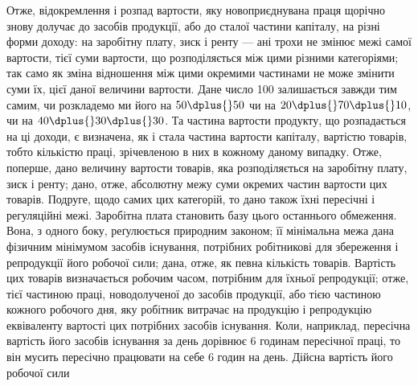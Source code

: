 Отже, відокремлення і розпад вартости, яку новоприєднувана праця щорічно
знову долучає до засобів продукції, або до сталої частини капіталу, на різні форми
доходу: на заробітну плату, зиск і ренту — ані трохи не змінює межі самої вартости,
тієї суми вартости, що розподіляється між цими різними категоріями; так
само як зміна відношення між цими окремими частинами не може змінити суми їх,
цієї даної величини вартости. Дане число 100 залишається завжди тим самим, чи
розкладемо ми його на $50 \dplus{} 50$ чи на $20 \dplus{} 70 \dplus{} 10$, чи на $40 \dplus{} 30 \dplus{} 30$. Та
частина вартости продукту, що розпадається на ці доходи, є визначена, як і стала
частина вартости капіталу, вартістю товарів, тобто кількістю праці, зрічевленою
в них в кожному даному випадку. Отже, поперше, дано величину вартости
товарів, яка розподіляється на заробітну плату, зиск і ренту; дано, отже, абсолютну
межу суми окремих частин вартости цих товарів. Подруге, щодо самих
цих категорій, то дано також їхні пересічні і регуляційні межі. Заробітна плата
становить базу цього останнього обмеження. Вона, з одного боку, реґулюється
природним законом; її мінімальна межа дана фізичним мінімумом засобів існування,
потрібних робітникові для збереження і репродукції його робочої сили;
дана, отже, як певна кількість товарів. Вартість цих товарів визначається робочим
часом, потрібним для їхньої репродукції; отже, тієї частиною праці, новодолученої
до засобів продукції, або тією частиною кожного робочого дня, яку
робітник витрачає на продукцію і репродукцію еквіваленту вартості цих потрібних
засобів існування. Коли, наприклад, пересічна вартість його засобів
існування за день дорівнює 6 годинам пересічної праці, то він мусить пересічно
працювати на себе 6 годин на день. Дійсна вартість його робочої сили
\parbreak{}  %
